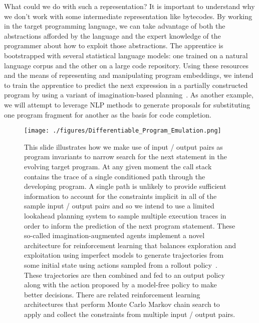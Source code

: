 
What could we do with such a representation? It is important to understand why we don’t work with some intermediate representation like bytecodes. By working in the target programming language, we can take advantage of both the abstractions afforded by the language and the expert knowledge of the programmer about how to exploit those abstractions. The apprentice is bootstrapped with several statistical language models: one trained on a natural language corpus and the other on a large code repository. Using these resources and the means of representing and manipulating program embeddings, we intend to train the apprentice to predict the next expression in a partially constructed program by using a variant of imagination-based planning~\cite{PascanuetalCoRR-17}. As another example, we will attempt to leverage NLP methods to generate proposals for substituting one program fragment for another as the basis for code completion. 


\begin{figure}
%
  \begin{center} 
    \texttt{[image: ./figures/Differentiable\_Program\_Emulation.png]} %
  \end{center}
%
  \caption{This slide illustrates how we make use of input / output pairs as program invariants to narrow search for the next statement in the evolving target program. At any given moment the call stack contains the trace of a single conditioned path through the developing program. A single path is unlikely to provide sufficient information to account for the constraints implicit in all of the sample input / output pairs and so we intend to use a limited lookahead planning system to sample multiple execution traces in order to inform the prediction of the next program statement. 
%
These so-called imagination-augmented agents implement a novel architecture for reinforcement learning that balances exploration and exploitation using imperfect models to generate trajectories from some initial state using actions sampled from a rollout policy~\cite{PascanuetalCoRR-17,WeberetalCoRR-17,HamricketalCoRR-17,GuezetalCoRR-18}. These trajectories are then combined and fed to an output policy along with the action proposed by a model-free policy to make better decisions. There are related reinforcement learning architectures that perform Monte Carlo Markov chain search to apply and collect the constraints from multiple input / output pairs.}
%
  \label{fig_emulator}
%
\end{figure}


